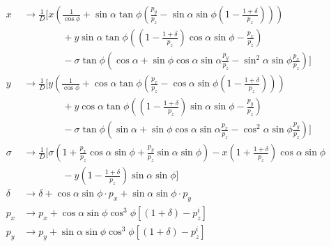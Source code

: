\documentclass[english]{article}
\begin{document}
\begin{align}
    x &\to \frac{1}{D}\bigg[ x\left(\frac{1}{\cos\phi}+\sin\alpha\tan\phi\left(\frac{p_y}{p_z}-\sin\alpha\sin\phi\left(1-\frac{1+\delta}{p_z}\right)\right)\right) \\
    &\qquad\qquad + y\sin\alpha\tan\phi\left(\left(1-\frac{1+\delta}{p_z}\right)\cos\alpha\sin\phi-\frac{p_x}{p_z}\right) \\
    &\qquad\qquad - \sigma\tan\phi\left(\cos\alpha+\sin\phi\cos\alpha\sin\alpha\frac{p_y}{p_z}-\sin^2\alpha\sin\phi\frac{p_x}{p_z}\right)\bigg] \\
    y &\to \frac{1}{D}\bigg[ y\left(\frac{1}{\cos\phi}+\cos\alpha\tan\phi\left(\frac{p_x}{p_z}-\cos\alpha\sin\phi\left(1-\frac{1+\delta}{p_z}\right)\right)\right) \\
    &\qquad\qquad + y\cos\alpha\tan\phi\left(\left(1-\frac{1+\delta}{p_z}\right)\sin\alpha\sin\phi-\frac{p_y}{p_z}\right) \\
    &\qquad\qquad - \sigma\tan\phi \left(\sin\alpha+\sin\phi\cos\alpha\sin\alpha\frac{p_x}{p_z}-\cos^2\alpha\sin\phi\frac{p_y}{p_z}\right)\bigg] \\
    \sigma &\to \frac{1}{D}\bigg[\sigma\left(1+\frac{p_x}{p_z}\cos\alpha\sin\phi+\frac{p_y}{p_z}\sin\alpha\sin\phi\right)
    -x\left(1+\frac{1+\delta}{p_z}\right)\cos\alpha\sin\phi \\
    &\qquad\qquad -y\left(1-\frac{1+\delta}{p_z}\right)\sin\alpha\sin\phi\bigg] \\
    \delta &\to \delta + \cos\alpha\sin\phi\cdot p_x + \sin\alpha\sin\phi\cdot p_y \\
    p_x &\to p_x + \cos\alpha\sin\phi\cos^3\phi\left[(1+\delta)-p_z^i\right] \\
    p_y &\to p_y + \sin\alpha\sin\phi\cos^3\phi\left[(1+\delta)-p_z^i\right]
\end{align}
\end{document}
